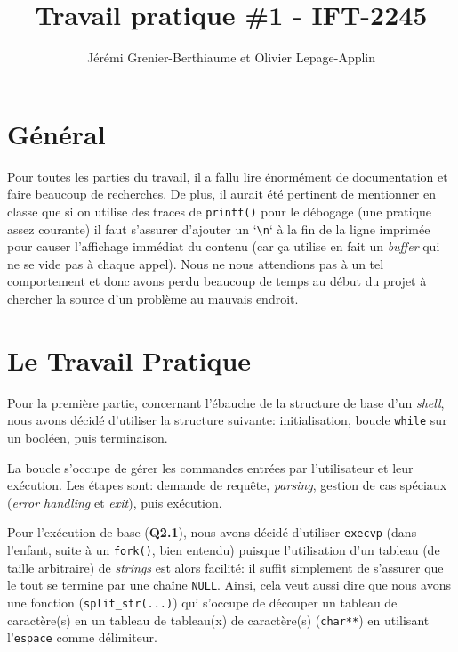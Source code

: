 \documentclass{article}
\title{Travail pratique \#1 - IFT-2245}
\author{Jérémi Grenier-Berthiaume et Olivier Lepage-Applin}
\begin{document}
\maketitle

\section{Général}

Pour toutes les parties du travail, il a fallu lire énormément de documentation et faire beaucoup de recherches. De plus, il aurait été pertinent de mentionner en classe que si on utilise des traces de \texttt{printf()} pour le débogage (une pratique assez courante) il faut s'assurer d'ajouter un `\texttt{\textbackslash n}` à la fin de la ligne imprimée pour causer l'affichage immédiat du contenu (car ça utilise en fait un \textit{buffer} qui ne se vide pas à chaque appel). Nous ne nous attendions pas à un tel comportement et donc avons perdu beaucoup de temps au début du projet à chercher la source d'un problème au mauvais endroit.\newline

\section{Le Travail Pratique}

Pour la première partie, concernant l'ébauche de la structure de base d'un \textit{shell}, nous avons décidé d'utiliser la structure suivante: initialisation, boucle \texttt{while} sur un  booléen, puis terminaison.

La boucle s'occupe de gérer les commandes entrées par l'utilisateur et leur exécution. Les étapes sont: demande de requête, \textit{parsing}, gestion de cas spéciaux (\textit{error handling} et \textit{exit}), puis exécution.\newline

Pour l'exécution de base (\textbf{Q2.1}), nous avons décidé d'utiliser \texttt{execvp} (dans l'enfant, suite à un \texttt{fork()}, bien entendu) puisque l'utilisation d'un tableau (de taille arbitraire) de \textit{strings} est alors facilité: il suffit simplement de s'assurer que le tout se termine par une chaîne \texttt{NULL}. Ainsi, cela veut aussi dire que nous avons une fonction (\texttt{split\_str(...)}) qui s'occupe de découper un tableau de caractère(s) en un tableau de tableau(x) de caractère(s) (\texttt{char**}) en utilisant l'\texttt{espace} comme délimiteur.\newline
\end{document}
